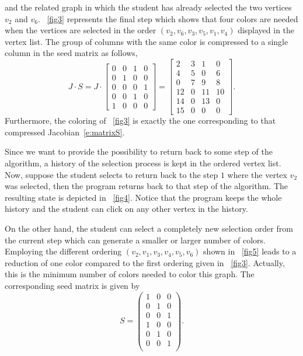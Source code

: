 \documentclass[12pt, oneside]{book}
\begin{document}
and the related graph in which the student has already selected the two vertices $v_2$ and $v_6$. \figurename~\ref{fig3} represents the final step which shows that four colors are needed when the vertices are selected in the order $(v_2, v_6, v_3, v_5, v_1, v_4)$ displayed in the vertex list. The group of columns with the same color is compressed to a single column in the seed matrix as follows,
\begin{equation}
\label{e:matrixS}
J \cdot S =
J \cdot
 \begin{bmatrix}
 0  & 0 & 1 & 0 \\
 0  & 1 & 0 & 0 \\
 0  & 0 & 0 & 1 \\
 0  & 0 & 1 & 0 \\
 1  & 0 & 0 & 0
 \end{bmatrix}
=
 \begin{bmatrix}
 2  & 3 & 1  & 0 \\
 4  & 5 & 0  & 6 \\
 0  & 7 & 9  & 8 \\
 12 & 0 & 11 & 10\\
 14 & 0 & 13 & 0 \\
 15 & 0 & 0  & 0
 \end{bmatrix}.
\end{equation}
Furthermore, the coloring of \figurename~\ref{fig3} is exactly the one corresponding to that compressed Jacobian~\eqref{e:matrixS}.

Since we want to provide the possibility to return back to some step of the algorithm, a history of the selection process is kept in the ordered vertex list. Now, suppose the student selects to return back to the step $1$ where the vertex $v_2$ was selected, then the program returns back to that step of the algorithm. The resulting state is depicted in \figurename~\ref{fig4}. Notice that the program keeps the whole history and the student can click on any other vertex in the history.

On the other hand, the student can select a completely new selection order from the current step which can generate a smaller or larger number of colors. Employing the different ordering $(v_2,v_1,v_3,v_4,v_5,v_6)$ shown in \figurename~\ref{fig5} leads to a reduction of one color compared to the first ordering given in \figurename~\ref{fig3}. Actually, this is the minimum number of colors needed to color this graph. The corresponding seed matrix is given by
$$
S =
 \begin{pmatrix}
 1 & 0 & 0 \\
 0 & 1 & 0 \\
 0 & 0 & 1 \\
 1 & 0 & 0 \\
 0 & 1 & 0 \\
 0 & 0 & 1 \\
 \end{pmatrix}.
$$
\end{document}
